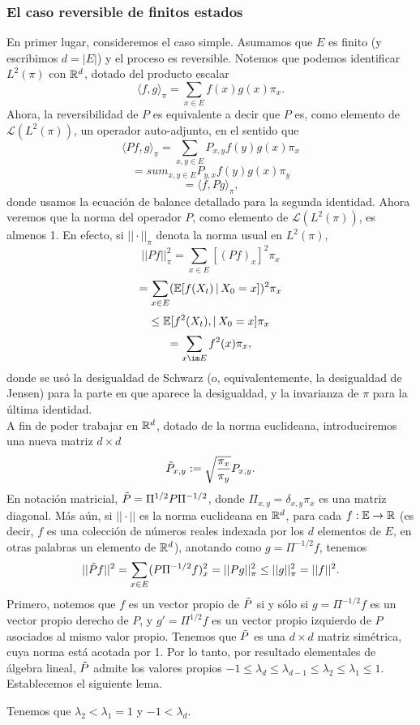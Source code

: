 \subsubsection{El caso reversible de finitos estados}
En primer lugar, consideremos el caso simple. Asumamos que $E$ es finito (y escribimos $d=|E|$) y el proceso es reversible. Notemos que podemos identificar $L^2(\pi)$ con $\mathbb R^d$, dotado  del producto escalar
\[\langle f,g \rangle_{\pi} = \sum_{x\in E}f(x)g(x)\pi_x.\]
Ahora, la reversibilidad de $P$ es equivalente a decir que $P$ es, como elemento de $\mathcal{L}(L^2(\pi))$, un operador auto-adjunto, en el sentido que
\[\langle Pf,g\rangle_{\pi} = \sum_{x,y\in E}P_{x,y}f(y)g(x)\pi_x\]
\[= sum_{x,y\in E}P_{y,x}f(y)g(x)\pi_y\]
\[= \langle f,Pg \rangle_{\pi},\]
donde usamos la ecuación de balance detallado para la segunda identidad. Ahora veremos que la norma del operador $P$, como elemento de $\mathcal{L}(L^2(\pi))$, es almenos 1. En efecto, si $||\cdot ||_{\pi}$ denota la norma usual en $L^2(\pi)$,
\[||Pf||_{\pi}^2 = \sum_{x\in E}\left[(Pf)_x\right]^2\pi_x\]
\[ = \sum_{x\in E}(\mathbb E[f(X_t)\,|\,X_0=x])^2\pi_x\]
\[\leq \mathbb E[f^2(X_t),|\,X_0=x]\pi_x\]
\[=\sum_{x\im E}f^2(x)\pi_x,\]
donde se usó la desigualdad de Schwarz (o, equivalentemente, la desigualdad de Jensen) para la parte en que aparece la desigualdad, y la invarianza de $\pi$ para la última identidad.\\
A fin de poder trabajar en $\mathbb R^d$, dotado de la norma euclideana, introduciremos una nueva matriz $d\times d$
\[\Tilde{P}_{x,y} := \sqrt{\frac{\pi_x}{\pi_y}}P_{x,y}.\]
En notación matricial, $\Tilde{P}=\Pi^{1/2}P\Pi^{-1/2}$, donde $\Pi_{x,y} = \delta_{x,y}\pi_x$ es una matriz diagonal. Más aún, si $||\cdot ||$ es la norma euclideana en $\mathbb R^d$, para cada $f:\mathbb E\rightarrow \mathbb R$ (es decir, $f$ es una colección de números reales indexada por los $d$ elementos de $E$, en otras palabras un elemento de $\mathbb R^d$), anotando como $g = \Pi^{-1/2}f$, tenemos
\[||\Tilde{P}f||^2 = \sum_{x\in E}(P\Pi^{-1/2}f)_x^2 = ||Pg||_{\pi}^2 \leq ||g||_{\pi}^2 = ||f||^2.\]
Primero, notemos que $f$ es un vector propio de $\Tilde{P}$ si y sólo si $g=\Pi^{-1/2}f$ es un vector propio derecho de $P$, y $g' = \Pi^{1/2}f$ es un vector propio izquierdo de $P$ asociados al mismo valor propio. Tenemos que $\Tilde{P}$ es una $d\times d$ matriz simétrica, cuya norma está acotada por 1. Por lo tanto, por resultado elementales de álgebra lineal, $\Tilde{P}$ admite los valores propios $-1\leq \lambda_d \leq \lambda_{d-1}\leq \lambda_2\leq \lambda_1\leq 1$. Establecemos el siguiente lema.
\begin{lem}
Tenemos que $\lambda_2 <\lambda_1 = 1$ y $-1<\lambda_d$.
\end{lem}

